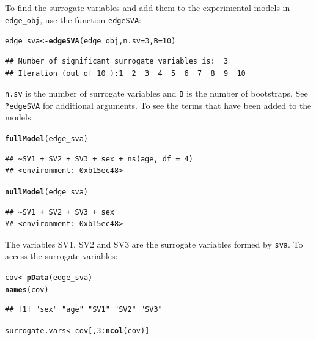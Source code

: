 \documentclass{article}\usepackage[]{graphicx}\usepackage[]{color}
\makeatletter
\newcommand{\hlnum}[1]{\textcolor[rgb]{0.686,0.059,0.569}{#1}}%
\newcommand{\hlopt}[1]{\textcolor[rgb]{0,0,0}{#1}}%
\newcommand{\hlstd}[1]{\textcolor[rgb]{0.345,0.345,0.345}{#1}}%
\newcommand{\hlkwb}[1]{\textcolor[rgb]{0.69,0.353,0.396}{#1}}%
\newcommand{\hlkwc}[1]{\textcolor[rgb]{0.333,0.667,0.333}{#1}}%
\newcommand{\hlkwd}[1]{\textcolor[rgb]{0.737,0.353,0.396}{\textbf{#1}}}%
\newenvironment{kframe}{%
 \def\at@end@of@kframe{}%
 \ifinner\ifhmode%
  \def\at@end@of@kframe{\end{minipage}}%
  \begin{minipage}{\columnwidth}%
 \fi\fi%
 \def\FrameCommand##1{\hskip\@totalleftmargin \hskip-\fboxsep
 \colorbox{shadecolor}{##1}\hskip-\fboxsep
     \hskip-\linewidth \hskip-\@totalleftmargin \hskip\columnwidth}%
 \MakeFramed {\advance\hsize-\width
   \@totalleftmargin\z@ \linewidth\hsize
   \@setminipage}}%
 {\par\unskip\endMakeFramed%
 \at@end@of@kframe}
\newenvironment{knitrout}{}{} %
\makeatother
\begin{document}
To find the surrogate variables and add them to the experimental models in {\tt edge\_obj}, use the function {\tt edgeSVA}:
\begin{knitrout}
\color{fgcolor}\begin{kframe}
\begin{alltt}
\hlstd{edge_sva} \hlkwb{<-} \hlkwd{edgeSVA}\hlstd{(edge_obj,} \hlkwc{n.sv} \hlstd{=} \hlnum{3}\hlstd{,} \hlkwc{B} \hlstd{=} \hlnum{10}\hlstd{)}
\end{alltt}
\begin{verbatim}
## Number of significant surrogate variables is:  3 
## Iteration (out of 10 ):1  2  3  4  5  6  7  8  9  10
\end{verbatim}
\end{kframe}
\end{knitrout}
{\tt n.sv} is the number of surrogate variables and {\tt B} is the number of bootstraps. See {\tt ?edgeSVA} for additional arguments. To see the terms that have been added to the models:
\begin{knitrout}
\color{fgcolor}\begin{kframe}
\begin{alltt}
\hlkwd{fullModel}\hlstd{(edge_sva)}
\end{alltt}
\begin{verbatim}
## ~SV1 + SV2 + SV3 + sex + ns(age, df = 4)
## <environment: 0xb15ec48>
\end{verbatim}
\begin{alltt}
\hlkwd{nullModel}\hlstd{(edge_sva)}
\end{alltt}
\begin{verbatim}
## ~SV1 + SV2 + SV3 + sex
## <environment: 0xb15ec48>
\end{verbatim}
\end{kframe}
\end{knitrout}
The variables SV1, SV2 and SV3 are the surrogate variables formed by {\tt sva}. To access the surrogate variables:
\begin{knitrout}
\color{fgcolor}\begin{kframe}
\begin{alltt}
\hlstd{cov} \hlkwb{<-} \hlkwd{pData}\hlstd{(edge_sva)}
\hlkwd{names}\hlstd{(cov)}
\end{alltt}
\begin{verbatim}
## [1] "sex" "age" "SV1" "SV2" "SV3"
\end{verbatim}
\begin{alltt}
\hlstd{surrogate.vars} \hlkwb{<-} \hlstd{cov[,} \hlnum{3}\hlopt{:}\hlkwd{ncol}\hlstd{(cov)]}
\end{alltt}
\end{kframe}
\end{knitrout}
\end{document}
